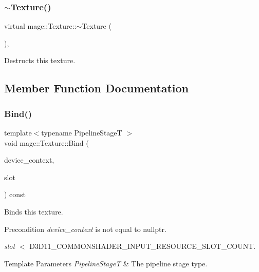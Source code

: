 \subsubsection{\texorpdfstring{$\sim$\+Texture()}{~Texture()}}
{\footnotesize\ttfamily virtual mage\+::\+Texture\+::$\sim$\+Texture (\begin{DoxyParamCaption}{ }\end{DoxyParamCaption})\hspace{0.3cm}{\ttfamily [virtual]}, {\ttfamily [default]}}

Destructs this texture. 

\subsection{Member Function Documentation}
\hypertarget{classmage_1_1_texture_aee77169c3cdfbfbbc9ac7b06ed8a5bdd}{}\label{classmage_1_1_texture_aee77169c3cdfbfbbc9ac7b06ed8a5bdd} 
\subsubsection{\texorpdfstring{Bind()}{Bind()}}
{\footnotesize\ttfamily template$<$typename Pipeline\+StageT $>$ \\
void mage\+::\+Texture\+::\+Bind (\begin{DoxyParamCaption}\item[{I\+D3\+D11\+Device\+Context2 $\ast$}]{device\+\_\+context,  }\item[{\hyperlink{namespacemage_af2b398bf98eb10351f49cad73fe2cc73}{u32}}]{slot }\end{DoxyParamCaption}) const\hspace{0.3cm}{\ttfamily [noexcept]}}

Binds this texture.

\begin{DoxyPrecond}{Precondition}
{\itshape device\+\_\+context} is not equal to {\ttfamily nullptr}. 

{\itshape slot} $<$ {\ttfamily D3\+D11\+\_\+\+C\+O\+M\+M\+O\+N\+S\+H\+A\+D\+E\+R\+\_\+\+I\+N\+P\+U\+T\+\_\+\+R\+E\+S\+O\+U\+R\+C\+E\+\_\+\+S\+L\+O\+T\+\_\+\+C\+O\+U\+NT}. 
\end{DoxyPrecond}

\begin{DoxyTemplParams}{Template Parameters}
{\em Pipeline\+StageT} & The pipeline stage type. \\
\hline
\end{DoxyTemplParams}

